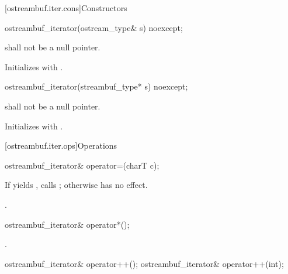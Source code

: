 [ostreambuf.iter.cons]{Constructors}

%
\begin{itemdecl}
ostreambuf_iterator(ostream_type& s) noexcept;
\end{itemdecl}

\begin{itemdescr}
\pnum
\requires
{}
shall not be a null pointer.

\pnum
\effects
Initializes  with .
\end{itemdescr}


%
\begin{itemdecl}
ostreambuf_iterator(streambuf_type* s) noexcept;
\end{itemdecl}

\begin{itemdescr}
\pnum
\requires
{}
shall not be a null pointer.

\pnum
\effects
Initializes  with .
\end{itemdescr}

[ostreambuf.iter.ops]{Operations}

%
\begin{itemdecl}
ostreambuf_iterator& operator=(charT c);
\end{itemdecl}

\begin{itemdescr}
\pnum
\effects
If
yields
,
calls
;
otherwise has no effect.

\pnum
\returns
{}.
\end{itemdescr}

%
\begin{itemdecl}
ostreambuf_iterator& operator*();
\end{itemdecl}

\begin{itemdescr}
\pnum
\returns
{}.
\end{itemdescr}

%
\begin{itemdecl}
ostreambuf_iterator& operator++();
ostreambuf_iterator& operator++(int);
\end{itemdecl}

